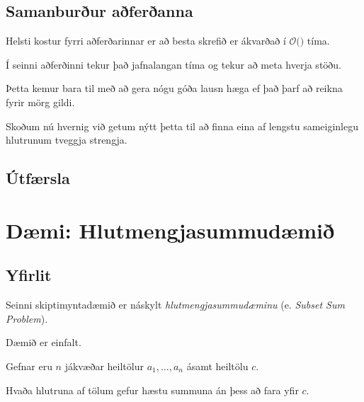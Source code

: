 \subsection{Samanburður aðferðanna}
{
    {
        \item<1-> Helsti kostur fyrri aðferðarinnar er að besta skrefið er ákvarðað í $\mathcal{O}($$)$ tíma.
        \item<3-> Í seinni aðferðinni tekur það jafnalangan tíma og  tekur að meta hverja stöðu.
        \item<4-> Þetta kemur bara til með að gera nógu góða lausn hæga ef það þarf að reikna fyrir mörg gildi.
        \item<5-> Skoðum nú hvernig við getum nýtt þetta til að finna eina af lengstu sameiginlegu hlutrunum tveggja strengja.
    }
}

\subsection{Útfærsla}
{
}

\section{Dæmi: Hlutmengjasummudæmið}
\subsection{Yfirlit}
{
    {
        \item<1-> Seinni skiptimyntadæmið er náskylt \emph{hlutmengjasummudæminu} (e. \emph{Subset Sum Problem}).
        \item<2-> Dæmið er einfalt.
        \item<3-> Gefnar eru $n$ jákvæðar heiltölur $a_1, \dots, a_n$ ásamt heiltölu $c$.
        \item<4-> Hvaða hlutruna af tölum gefur hæstu summuna án þess að fara yfir $c$.
    }
}

